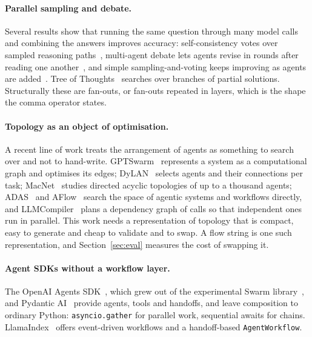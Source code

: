 \documentclass[11pt]{article}
\newcommand{\code}[1]{\texttt{#1}}
\begin{document}
\paragraph{Parallel sampling and debate.}
Several results show that running the same question through many model calls and combining the answers improves accuracy: self-consistency votes over sampled reasoning paths~\cite{self_consistency}, multi-agent debate lets agents revise in rounds after reading one another~\cite{debate}, and simple sampling-and-voting keeps improving as agents are added~\cite{more_agents}. Tree of Thoughts~\cite{tot} searches over branches of partial solutions. Structurally these are fan-outs, or fan-outs repeated in layers, which is the shape the comma operator states.

\paragraph{Topology as an object of optimisation.}
A recent line of work treats the arrangement of agents as something to search over and not to hand-write. GPTSwarm~\cite{gptswarm} represents a system as a computational graph and optimises its edges; DyLAN~\cite{dylan} selects agents and their connections per task; MacNet~\cite{macnet} studies directed acyclic topologies of up to a thousand agents; ADAS~\cite{adas} and AFlow~\cite{aflow} search the space of agentic systems and workflows directly, and LLMCompiler~\cite{llmcompiler} plans a dependency graph of calls so that independent ones run in parallel. This work needs a representation of topology that is compact, easy to generate and cheap to validate and to swap. A flow string is one such representation, and Section~\ref{sec:eval} measures the cost of swapping it.

\paragraph{Agent SDKs without a workflow layer.}
The OpenAI Agents SDK~\cite{openai_agents}, which grew out of the experimental Swarm library~\cite{openai_swarm}, and Pydantic AI~\cite{pydantic_ai} provide agents, tools and handoffs, and leave composition to ordinary Python: \code{asyncio.gather} for parallel work, sequential awaits for chains. LlamaIndex~\cite{llamaindex} offers event-driven workflows and a handoff-based \code{AgentWorkflow}.
\end{document}

